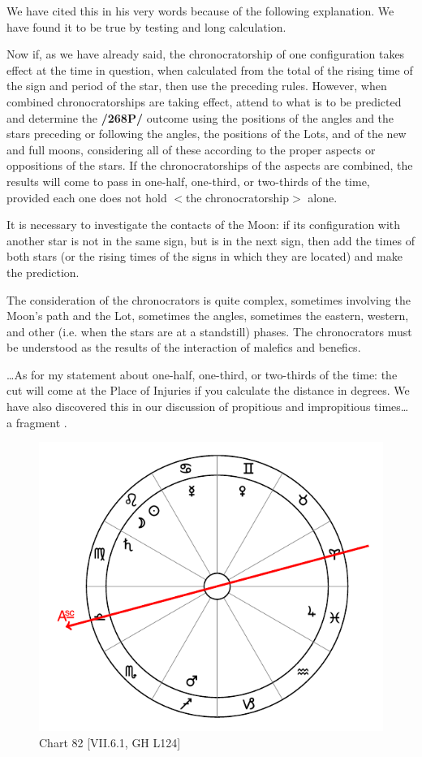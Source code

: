 We have cited this in his very words because of the following explanation. We have found it to be true by testing and long calculation.

Now if, as we have already said, the chronocratorship of one configuration takes effect at the time in question, when calculated from the total of the rising time of the sign and period of the star, then use the preceding rules. However, when combined chronocratorships are taking effect, attend to what is to be
predicted and determine the \textbf{/268P/} outcome using the positions of the angles and the stars preceding or following the angles, the positions of the Lots, and of the new and full moons, considering all of these according to the proper aspects or oppositions of the stars. 
If the chronocratorships of the aspects are combined, the results will come to pass in one-half, one-third, or two-thirds of the time, provided each one does not hold $<$the chronocratorship$>$ alone.

It is necessary to investigate the contacts of the Moon: if its configuration with another star is not in the same sign, but is in the next sign, then add the times of both stars (or the rising times of the signs in which they are located) and make the prediction. 

The consideration of the chronocrators is quite complex, sometimes involving the Moon’s path and the Lot, sometimes the angles, sometimes the eastern, western, and other (i.e. when the stars are at a standstill) phases. The chronocrators must be understood as the
results of the interaction of malefics and benefics.

…As for my statement about one-half, one-third, or two-thirds of the time: the cut will come at the Place of Injuries if you calculate the distance in degrees. We have also discovered this in our discussion of
propitious and impropitious times… a fragment .

\begin{figure}
\centering
\vspace{-10pt}
\includegraphics[width=.68\textwidth]{charts/7_6_01}
\caption{Chart 82 [VII.6.1, GH L124]}
\label{fig:chart82}
\end{figure} 

